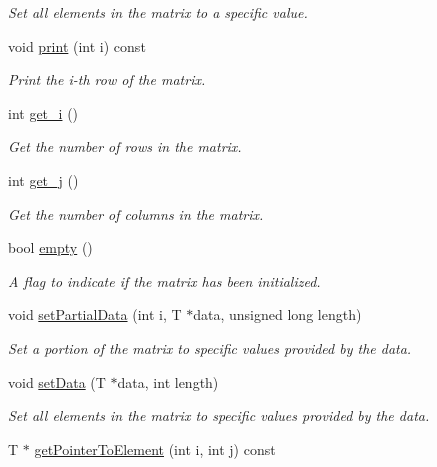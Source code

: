 \begin{DoxyCompactItemize}
\begin{DoxyCompactList}\small\item\em Set all elements in the matrix to a specific value. \end{DoxyCompactList}\item 
void \mbox{\hyperlink{classMatrix2D_a27ccf42f23c568b2397b744ec32a41d1}{print}} (int i) const
\begin{DoxyCompactList}\small\item\em Print the i-\/th row of the matrix. \end{DoxyCompactList}\item 
int \mbox{\hyperlink{classMatrix2D_a9d44e60eef0274c20ed9bd1f597c89eb}{get\+\_\+i}} ()
\begin{DoxyCompactList}\small\item\em Get the number of rows in the matrix. \end{DoxyCompactList}\item 
int \mbox{\hyperlink{classMatrix2D_a30918dfce713408a9b3188bea33dbb57}{get\+\_\+j}} ()
\begin{DoxyCompactList}\small\item\em Get the number of columns in the matrix. \end{DoxyCompactList}\item 
bool \mbox{\hyperlink{classMatrix2D_a5fd8ff857d4554c8fed6ca1ca2f1e87d}{empty}} ()
\begin{DoxyCompactList}\small\item\em A flag to indicate if the matrix has been initialized. \end{DoxyCompactList}\item 
void \mbox{\hyperlink{classMatrix2D_a2a0f91e493892f9c56e98d1e20dcd465}{set\+Partial\+Data}} (int i, T $\ast$data, unsigned long length)
\begin{DoxyCompactList}\small\item\em Set a portion of the matrix to specific values provided by the data. \end{DoxyCompactList}\item 
void \mbox{\hyperlink{classMatrix2D_a28515c515652637734a22a3440e80258}{set\+Data}} (T $\ast$data, int length)
\begin{DoxyCompactList}\small\item\em Set all elements in the matrix to specific values provided by the data. \end{DoxyCompactList}\item 
T $\ast$ \mbox{\hyperlink{classMatrix2D_ac3d6fbe385374e65ce00a34be5a7d323}{get\+Pointer\+To\+Element}} (int i, int j) const

\end{DoxyCompactItemize}
